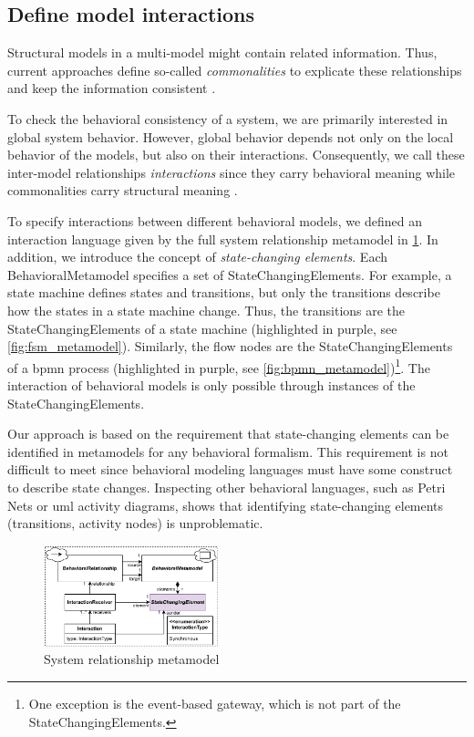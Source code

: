 \documentclass{jot}
\begin{document}
\subsection{Define model interactions}
Structural models in a multi-model might contain related information.
Thus, current approaches define so-called \emph{commonalities} to explicate these relationships and keep the information consistent \cite{stunkelComprehensiveSystemsFormal2021,klareCommonalitiesPreservingConsistency2019}.

To check the behavioral consistency of a system, we are primarily interested in global system behavior.
However, global behavior depends not only on the local behavior of the models, but also on their interactions.
Consequently, we call these inter-model relationships \emph{interactions} since they carry behavioral meaning while commonalities carry structural meaning \cite{krauterBehavioralConsistencyHeterogeneous2021}.

To specify interactions between different behavioral models, we defined an interaction language given by the full system relationship metamodel in \cref{fig:srm_metamodel}.
In addition, we introduce the concept of \emph{state-changing elements}.
Each \textsf{BehavioralMetamodel} specifies a set of \textsf{StateChangingElement}s.
For example, a state machine defines states and transitions, but only the transitions describe how the states in a state machine change.
Thus, the transitions are the \textsf{StateChangingElement}s of a state machine (highlighted in purple, see \cref{fig:fsm_metamodel}).
Similarly, the flow nodes are the \textsf{StateChangingElement}s of a \gls*{bpmn} process (highlighted in purple, see \cref{fig:bpmn_metamodel})\footnote{One exception is the event-based gateway, which is not part of the \textsf{StateChangingElement}s.}.
The interaction of behavioral models is only possible through instances of the \textsf{StateChangingElement}s.

Our approach is based on the requirement that state-changing elements can be identified in metamodels for any behavioral formalism.
This requirement is not difficult to meet since behavioral modeling languages must have some construct to describe state changes.
Inspecting other behavioral languages, such as Petri Nets or \gls*{uml} activity diagrams, shows that identifying state-changing elements (transitions, activity nodes) is unproblematic. 

\begin{figure}[h]
    \centering
    \includegraphics[width=0.45\textwidth]{figures/srm_metamodel.pdf}
    \caption{System relationship metamodel}
    \label{fig:srm_metamodel}
\end{figure}
\end{document}
